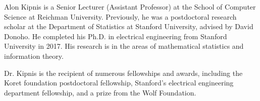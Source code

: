 Alon Kipnis is a Senior Lecturer (Assistant Professor) at the School of Computer Science at Reichman University. Previously, he was a postdoctoral research scholar at the Department of Statistics at Stanford University, advised by David Donoho. He completed his Ph.D. in electrical engineering from Stanford University in 2017. His research is in the areas of mathematical statistics and information theory. 

Dr. Kipnis is the recipient of numerous fellowships and awards, including the Koret foundation postdoctoral fellowship, Stanford's electrical engineering department fellowship, and a prize from the Wolf Foundation.